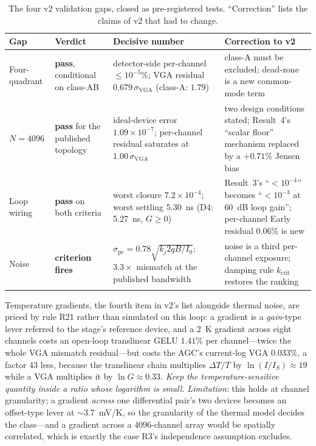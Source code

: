 \documentclass[11pt]{article}
\begin{document}
\begin{table}[h]
\centering
\caption{The four v2 validation gaps, closed as pre-registered tests. ``Correction'' lists the claims of v2 that had to change.}
\label{tab:gaps}
\footnotesize
\begin{tabular}{p{2.3cm}p{2.6cm}p{4.6cm}p{5.0cm}}
\toprule
Gap & Verdict & Decisive number & Correction to v2 \\
\midrule
Four-quadrant & \textbf{pass}, conditional on class-AB & detector-side per-channel $\le10^{-5}\%$; VGA residual $0.679\,\sigma_{\mathrm{VGA}}$ (class-A: $1.79$) & class-A must be excluded; dead-zone is a new common-mode term \\
$N = 4096$ & \textbf{pass} for the published topology & ideal-device error $1.09\times10^{-7}$; per-channel residual saturates at $1.00\,\sigma_{\mathrm{VGA}}$ & two design conditions stated; Result~4's ``scalar floor'' mechanism replaced by a $+0.71\%$ Jensen bias \\
Loop wiring & \textbf{pass} on both criteria & worst closure $7.2\times10^{-4}$; worst settling 5.30~ns (D4: 5.27~ns, $G \ge 0$) & Result~3's ``$<10^{-4}$'' becomes ``$<10^{-3}$ at 60~dB loop gain''; per-channel Early residual $0.06\%$ is new \\
Noise & \textbf{criterion fires} & $\sigma_{\mathrm{pc}} = 0.78\sqrt{k_j 2qB/I_0}$; $3.3\times$ mismatch at the published bandwidth & noise is a third per-channel exposure; damping rule $k_{\mathrm{crit}}$ restores the ranking \\
\bottomrule
\end{tabular}
\end{table}

Temperature gradients, the fourth item in v2's list alongside thermal noise, are priced by rule R21 rather than simulated on this loop: a gradient is a \textit{gain}-type lever referred to the stage's reference device, and a 2~K gradient across eight channels costs an open-loop translinear GELU $1.41\%$ per channel---twice the whole VGA mismatch residual---but costs the AGC's current-log VGA $0.033\%$, a factor 43 less, because the translinear chain multiplies $\Delta T/T$ by $\ln(I/I_S)\approx19$ while a VGA multiplies it by $\ln G \approx 0.33$. \textit{Keep the temperature-sensitive quantity inside a ratio whose logarithm is small.} \textit{Limitation}: this holds at channel granularity; a gradient \textit{across} one differential pair's two devices becomes an offset-type lever at ${\sim}3.7$~mV/K, so the granularity of the thermal model decides the class---and a gradient across a 4096-channel array would be spatially correlated, which is exactly the case R3's independence assumption excludes.
\end{document}
